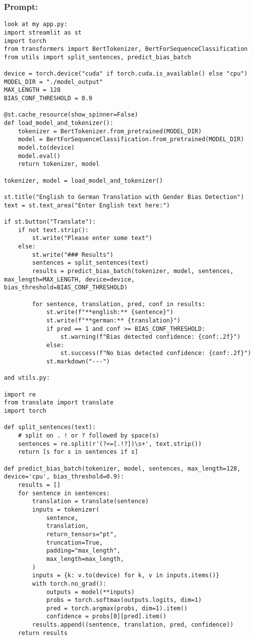 \subsubsection{Prompt: } 

\begin{lstlisting}
look at my app.py: 
import streamlit as st
import torch
from transformers import BertTokenizer, BertForSequenceClassification
from utils import split_sentences, predict_bias_batch

device = torch.device("cuda" if torch.cuda.is_available() else "cpu")
MODEL_DIR = "./model_output" 
MAX_LENGTH = 128
BIAS_CONF_THRESHOLD = 0.9

@st.cache_resource(show_spinner=False)
def load_model_and_tokenizer():
    tokenizer = BertTokenizer.from_pretrained(MODEL_DIR)
    model = BertForSequenceClassification.from_pretrained(MODEL_DIR)
    model.to(device)
    model.eval()
    return tokenizer, model

tokenizer, model = load_model_and_tokenizer()

st.title("English to German Translation with Gender Bias Detection")
text = st.text_area("Enter English text here:")

if st.button("Translate"):
    if not text.strip():
        st.write("Please enter some text")
    else:
        st.write("### Results")
        sentences = split_sentences(text)
        results = predict_bias_batch(tokenizer, model, sentences, max_length=MAX_LENGTH, device=device, bias_threshold=BIAS_CONF_THRESHOLD)

        for sentence, translation, pred, conf in results:
            st.write(f"**english:** {sentence}")
            st.write(f"**german:** {translation}")
            if pred == 1 and conf >= BIAS_CONF_THRESHOLD:
                st.warning(f"Bias detected confidence: {conf:.2f}")
            else:
                st.success(f"No bias detected confidence: {conf:.2f}")
            st.markdown("---")

and utils.py:

import re
from translate import translate
import torch

def split_sentences(text):
    # split on . ! or ? followed by space(s)
    sentences = re.split(r'(?<=[.!?])\s+', text.strip())
    return [s for s in sentences if s]

def predict_bias_batch(tokenizer, model, sentences, max_length=128, device='cpu', bias_threshold=0.9):
    results = []
    for sentence in sentences:
        translation = translate(sentence)
        inputs = tokenizer(
            sentence,
            translation,
            return_tensors="pt",
            truncation=True,
            padding="max_length",
            max_length=max_length,
        )
        inputs = {k: v.to(device) for k, v in inputs.items()}
        with torch.no_grad():
            outputs = model(**inputs)
            probs = torch.softmax(outputs.logits, dim=1)
            pred = torch.argmax(probs, dim=1).item()
            confidence = probs[0][pred].item()
        results.append((sentence, translation, pred, confidence))
    return results


\end{lstlisting}
